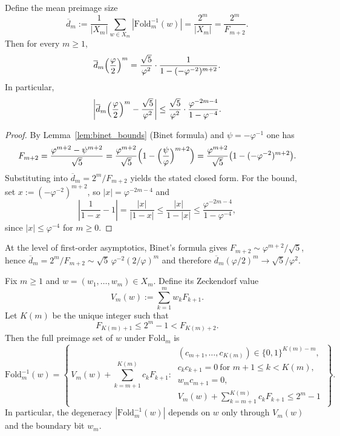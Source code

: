 \begin{proposition}
\label{prop:mean_deg_exact}
Define the mean preimage size
\[
\overline{d}_m:=\frac{1}{|X_m|}\sum_{w\in X_m}|\mathrm{Fold}_m^{-1}(w)|=\frac{2^m}{|X_m|}=\frac{2^m}{F_{m+2}}.
\]
Then for every $m\ge 1$,
\[
\overline{d}_m\Bigl(\frac{\varphi}{2}\Bigr)^m=\frac{\sqrt{5}}{\varphi^2}\cdot \frac{1}{1-(-\varphi^{-2})^{m+2}}.
\]
In particular,
\[
\left|\overline{d}_m\Bigl(\frac{\varphi}{2}\Bigr)^m-\frac{\sqrt{5}}{\varphi^2}\right|
\le
\frac{\sqrt{5}}{\varphi^2}\cdot \frac{\varphi^{-2m-4}}{1-\varphi^{-4}}.
\]
\end{proposition}

\begin{proof}
By Lemma~\ref{lem:binet_bounds} (Binet formula) and $\psi=-\varphi^{-1}$ one has
\[
F_{m+2}=\frac{\varphi^{m+2}-\psi^{m+2}}{\sqrt{5}}
=\frac{\varphi^{m+2}}{\sqrt{5}}\Bigl(1-\Bigl(\frac{\psi}{\varphi}\Bigr)^{m+2}\Bigr)
=\frac{\varphi^{m+2}}{\sqrt{5}}\bigl(1-(-\varphi^{-2})^{m+2}\bigr).
\]
Substituting into $\overline{d}_m=2^m/F_{m+2}$ yields the stated closed form.
For the bound, set $x:=(-\varphi^{-2})^{m+2}$, so $|x|=\varphi^{-2m-4}$ and
\[
\left|\frac{1}{1-x}-1\right|=\frac{|x|}{|1-x|}\le \frac{|x|}{1-|x|}\le \frac{\varphi^{-2m-4}}{1-\varphi^{-4}},
\]
since $|x|\le \varphi^{-4}$ for $m\ge 0$.
\end{proof}

\begin{remark}
At the level of first-order asymptotics, Binet's formula gives $F_{m+2}\sim \varphi^{m+2}/\sqrt{5}$, hence $\overline{d}_m=2^m/F_{m+2}\sim \sqrt{5}\,\varphi^{-2}(2/\varphi)^m$ and therefore $\overline{d}_m(\varphi/2)^m\to \sqrt{5}/\varphi^2$.
\end{remark}

\begin{proposition}
\label{prop:foldm_preimages_general}
Fix $m\ge 1$ and $w=(w_1,\dots,w_m)\in X_m$.
Define its Zeckendorf value
\[
V_m(w):=\sum_{k=1}^m w_k F_{k+1}.
\]
Let $K(m)$ be the unique integer such that
\[
F_{K(m)+1}\le 2^m-1 < F_{K(m)+2}.
\]
Then the full preimage set of $w$ under $\mathrm{Fold}_m$ is
\[
\mathrm{Fold}_m^{-1}(w)=\left\{\,V_m(w)+\sum_{k=m+1}^{K(m)} c_k F_{k+1}:\ 
\begin{array}{l}
(c_{m+1},\dots,c_{K(m)})\in\{0,1\}^{K(m)-m},\\
c_kc_{k+1}=0\ \text{for }m+1\le k<K(m),\\
w_m c_{m+1}=0,\\
V_m(w)+\sum_{k=m+1}^{K(m)} c_k F_{k+1}\le 2^m-1
\end{array}
\,\right\}.
\]
In particular, the degeneracy $|\mathrm{Fold}_m^{-1}(w)|$ depends on $w$ only through $V_m(w)$ and the boundary bit $w_m$.
\end{proposition}

